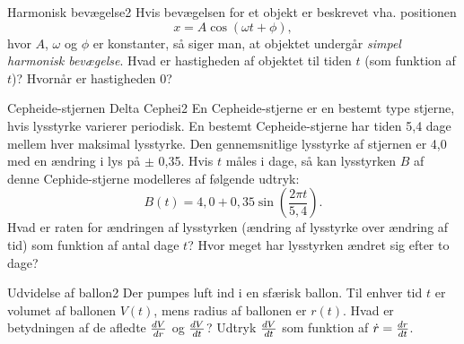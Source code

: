 \begin{opgave}{Harmonisk bevægelse}{2}
Hvis bevægelsen for et objekt er beskrevet vha. positionen
\begin{equation*}
x = A \cos (\omega t + \phi),
\end{equation*}
hvor $A$, $\omega$ og $\phi$ er konstanter, så siger man, at objektet undergår \emph{simpel harmonisk bevægelse}. 
\opg Hvad er hastigheden af objektet til tiden $t$ (som funktion af $t$)?
\opg Hvornår er hastigheden 0?
\end{opgave}

\begin{opgave}{Cepheide-stjernen Delta Cephei}{2}
En Cepheide-stjerne er en bestemt type stjerne, hvis lysstyrke varierer periodisk. En bestemt Cepheide-stjerne har tiden 5,4 dage mellem hver maksimal lysstyrke. Den gennemsnitlige lysstyrke af stjernen er 4,0 med en ændring i lys på $\pm$ 0,35. Hvis $t$ måles i dage, så kan lysstyrken $B$ af denne Cephide-stjerne modelleres af følgende udtryk:
\begin{equation*}
B(t) = 4,0 + 0,35\sin \left( \frac{2\pi t}{5,4} \right).
\end{equation*}
\opg Hvad er raten for ændringen af lysstyrken (ændring af lysstyrke over ændring af tid) som funktion af antal dage $t$?
\opg Hvor meget har lysstyrken ændret sig efter to dage?
\end{opgave}

\begin{opgave}{Udvidelse af ballon}{2}
Der pumpes luft ind i en sfærisk ballon. Til enhver tid $t$ er volumet af ballonen $V(t)$, mens radius af ballonen er $r(t)$.
\opg Hvad er betydningen af de afledte ${d{V} \over d{r}}$ og ${d{V} \over d{t}}$?
\opg Udtryk ${d{V} \over d{t}}$ som funktion af $\dot{r} = {d{r} \over d{t}}$.
\end{opgave}

